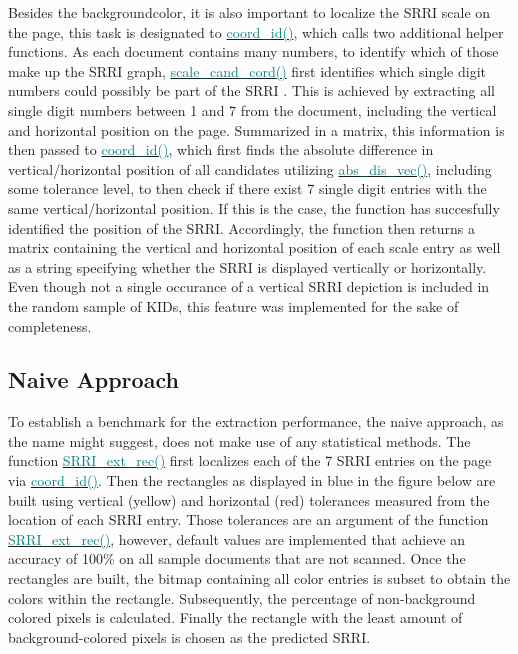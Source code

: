 \documentclass[aodsor,preprint]{imsart}
\numberwithin{equation}{section}
\theoremstyle{plain}
\begin{document}
Besides the backgroundcolor, it is also important to localize the SRRI scale on the page, this task is designated to \href{https://github.com/Base-R-Best-R/KID/blob/main/Code/Package/KIDs/R/coord_id.R}{\textcolor{teal}{coord\_id()}}, which calls two additional helper functions. As each document contains many numbers, to identify which of those make up the SRRI graph, \href{https://github.com/Base-R-Best-R/KID/blob/main/Code/Package/KIDs/R/scale_cand_coord.R}{\textcolor{teal}{scale\_cand\_cord()}} first identifies which single digit numbers could possibly be part of the SRRI \citep{pdftools}. This is achieved by extracting all single digit numbers between 1 and 7 from the document, including the vertical and horizontal position on the page. Summarized in a matrix, this information is then passed to \href{https://github.com/Base-R-Best-R/KID/blob/main/Code/Package/KIDs/R/coord_id.R}{\textcolor{teal}{coord\_id()}}, which first finds the absolute difference in vertical/horizontal position of all candidates utilizing \href{https://github.com/Base-R-Best-R/KID/blob/main/Code/Package/KIDs/R/abs_dis_vec.R}{\textcolor{teal}{abs\_dis\_vec()}}, including some tolerance level, to then check if there exist 7 single digit entries with the same vertical/horizontal position. If this is the case, the function has succesfully identified the position of the SRRI. Accordingly, the function then returns a matrix containing the vertical and horizontal position of each scale entry as well as a string specifying whether the SRRI is displayed vertically or horizontally. Even though not a single occurance of a vertical SRRI depiction is included in the random sample of KIDs, this feature was implemented for the sake of completeness.

\subsection{Naive Approach}
To establish a benchmark for the extraction performance, the naive approach, as the name might suggest, does not make use of any statistical methods. The function \href{https://github.com/Base-R-Best-R/KID/blob/main/Code/Package/KIDs/R/SRRI_ext_rec.R}{\textcolor{teal}{SRRI\_ext\_rec()}} first localizes each of the 7 SRRI entries on the page via \href{https://github.com/Base-R-Best-R/KID/blob/main/Code/Package/KIDs/R/coord_id.R}{\textcolor{teal}{coord\_id()}}. Then the rectangles as displayed in blue in the figure below are built using vertical (yellow) and horizontal (red) tolerances measured from the location of each SRRI entry. Those tolerances are an argument of the function \href{https://github.com/Base-R-Best-R/KID/blob/main/Code/Package/KIDs/R/SRRI_ext_rec.R}{\textcolor{teal}{SRRI\_ext\_rec()}}, however, default values are implemented that achieve an accuracy of 100\% on all sample documents that are not scanned. Once the rectangles are built, the bitmap containing all color entries is subset to obtain the colors within the rectangle. Subsequently, the percentage of non-background colored pixels is calculated. Finally the rectangle with the least amount of background-colored pixels is chosen as the predicted SRRI.
\end{document}
